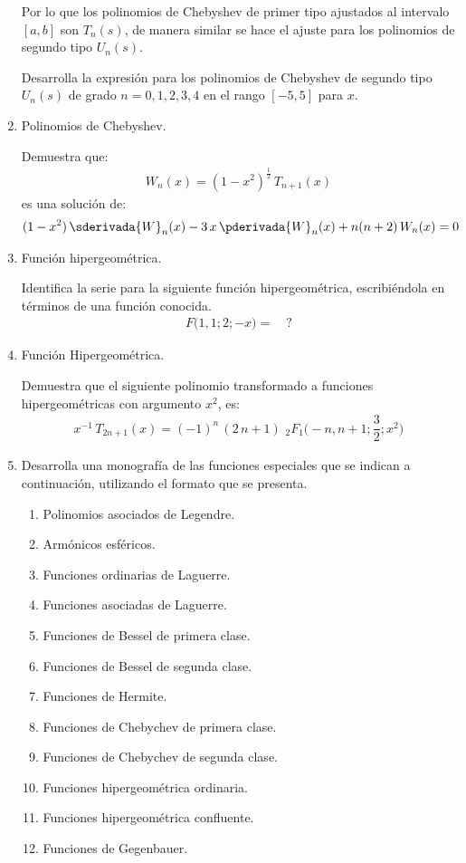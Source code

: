 \begin{enumerate}
Por lo que los polinomios de Chebyshev de primer tipo ajustados al intervalo $[a, b]$ son $T_{n}(s)$, de manera similar se hace el ajuste para los polinomios de segundo tipo  $U_{n} (s)$. 
\noindent
\par
Desarrolla la expresión para los polinomios de Chebyshev de segundo tipo $U_{n} (s)$ de grado $n = 0, 1, 2, 3, 4$ en el rango $[-5, 5]$ para $x$.
\item Polinomios de Chebyshev.
\par
\noindent
Demuestra que:
\begin{align*}
W_{n} (x) = (1 - x^{2})^{\frac{1}{2}} \, T_{n+1} (x)
\end{align*}
es una solución de:
\begin{align*}
(1 - x^{2}) \, \sderivada{W}_{n} (x) - 3 \, x \, \pderivada{W}_{n} (x) + n (n + 2) \, W_{n} (x) = 0
\end{align*}
\item Función hipergeométrica.
\par
\noindent
Identifica la serie para la siguiente función hipergeométrica, escribiéndola en términos de una función conocida.
\begin{align*}
F \big( 1, 1; 2; - x \big) = \quad ?
\end{align*}
\item Función Hipergeométrica.
\par
\noindent
Demuestra que el siguiente polinomio transformado a funciones hipergeométricas con argumento $x^{2}$, es:
\begin{align*}
x^{-1} \, T_{2n+1} (x) = (-1)^{n} \, (2 \, n + 1 ) \, \, {}_{2}F_{1} \bigg(-n, n+1; \dfrac{3}{2}; x^{2} \bigg)
\end{align*}
\item Desarrolla una monografía de las funciones especiales que se indican a continuación, utilizando el formato que se presenta.
\begin{enumerate}
\item Polinomios asociados de Legendre.
\item Armónicos esféricos.
\item Funciones ordinarias de Laguerre.
\item Funciones asociadas de Laguerre.
\item Funciones de Bessel de primera clase.
\item Funciones de Bessel de segunda clase.
\item Funciones de Hermite.
\item Funciones de Chebychev de primera clase.
\item Funciones de Chebychev de segunda clase.
\item Funciones hipergeométrica ordinaria.
\item Funciones hipergeométrica confluente.
\item Funciones de Gegenbauer.
\end{enumerate}


\end{enumerate}
